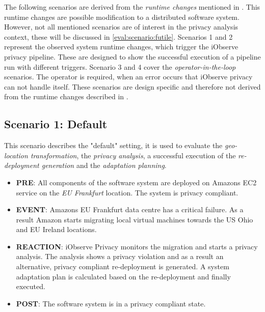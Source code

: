 The following scenarios are derived from the \textit{runtime changes} mentioned in \cite{Heinrich.2016b}. This runtime changes are possible modification to a distributed software system. However, not all mentioned scenarios are of interest in the privacy analysis context, these will be discussed in \autoref{eval:scenario:futile}. Scenarios 1 and 2 represent the observed system runtime changes, which trigger the iObserve privacy pipeline. These are designed to show the successful execution of a pipeline run with different triggers. Scenario 3 and 4 cover the \textit{operator-in-the-loop} scenarios. The operator is required, when an error occurs that iObserve privacy can not handle itself. These scenarios are design specific and therefore not derived from the runtime changes described in \cite{Heinrich.2016b}.

\subsection{Scenario 1: Default}
\label{eval:scenario:1}
This scenario describes the "default" setting, it is used to evaluate the \textit{geo-location transformation}, the \textit{privacy analysis}, a successful execution of the \textit{re-deployment generation} and the \textit{adaptation planning}.

\begin{itemize}
	\setlength\itemsep{0em}
	\item \textbf{PRE}: All components of the software system are deployed on Amazons EC2 service on the \textit{EU Frankfurt} location. The system is privacy compliant.
	\item \textbf{EVENT}: Amazons EU Frankfurt data centre has a critical failure. As a result Amazon starts migrating local virtual machines towards the US Ohio and EU Ireland locations.
	\item \textbf{REACTION}: iObserve Privacy monitors the migration and starts a privacy analysis. The analysis shows a privacy violation and as a result an alternative, privacy compliant re-deployment is generated. A system adaptation plan is calculated based on the re-deployment and finally executed.
	\item \textbf{POST}: The software system is in a privacy compliant state.
\end{itemize}

